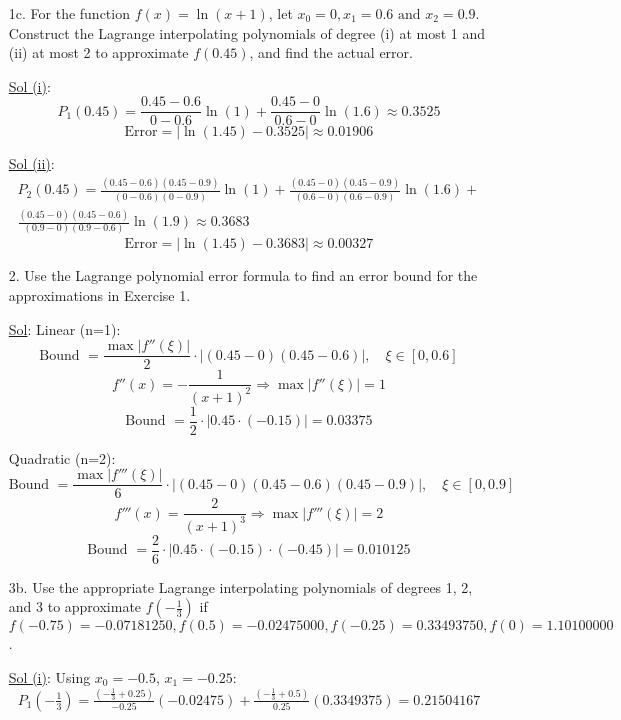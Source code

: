 \begin{enumerate}
  \item[1c.] For the function \( f(x) = \ln (x + 1) \), let \( x_0 =
    0, x_1 = 0.6 \textrm{ and } x_2 = 0.9 \). Construct the Lagrange
    interpolating polynomials of degree (i) at most 1 and (ii) at
    most 2 to approximate \( f(0.45) \), and find the actual error.

    \underline{Sol (i)}:
    \[
      P_1(0.45) = \frac{0.45 - 0.6}{0 - 0.6} \ln(1) + \frac{0.45 -
      0}{0.6 - 0} \ln(1.6) \approx 0.3525
    \]
    \[
      \text{Error} = |\ln(1.45) - 0.3525| \approx \boxed{0.01906}
    \]

    \underline{Sol (ii)}:
    \[
      \begin{array}{l}
        P_2(0.45) = \frac{(0.45-0.6)(0.45-0.9)}{(0-0.6)(0-0.9)}
        \ln(1) + \frac{(0.45-0)(0.45-0.9)}{(0.6-0)(0.6-0.9)} \ln(1.6)
        + \\ \frac{(0.45-0)(0.45-0.6)}{(0.9-0)(0.9-0.6)} \ln(1.9) \approx 0.3683
      \end{array}
    \]
    \[
      \text{Error} = |\ln(1.45) - 0.3683| \approx \boxed{0.00327}
    \]

  \item[2.] Use the Lagrange polynomial error formula to find an
    error bound for the approximations in Exercise 1.

    \underline{Sol}:
    Linear (n=1):
    \[
      \text{Bound } = \frac{\max |f''(\xi)|}{2} \cdot
      |(0.45-0)(0.45-0.6)|, \quad \xi \in [0, 0.6]
    \]
    \[
      f''(x) = -\frac{1}{(x+1)^2} \Rightarrow \max |f''(\xi)| = 1
    \]
    \[
      \text{Bound } = \frac{1}{2} \cdot |0.45 \cdot (-0.15)| = \boxed{0.03375}
    \]

    Quadratic (n=2):
    \[
      \text{Bound } = \frac{\max |f'''(\xi)|}{6} \cdot
      |(0.45-0)(0.45-0.6)(0.45-0.9)|, \quad \xi \in [0, 0.9]
    \]
    \[
      f'''(x) = \frac{2}{(x+1)^3} \Rightarrow \max |f'''(\xi)| = 2
    \]
    \[
      \text{Bound } = \frac{2}{6} \cdot |0.45 \cdot (-0.15) \cdot
      (-0.45)| = \boxed{0.010125}
    \]

  \item[3b.] Use the appropriate Lagrange interpolating polynomials
    of degrees 1, 2, and 3 to approximate \( f(- \frac{1}{3}) \) if
    \( f(-0.75) = -0.07181250, f(0.5) = -0.02475000, f(-0.25) =
    0.33493750, f(0) = 1.10100000 \).

    \underline{Sol (i)}:
    Using \( x_0 = -0.5 \), \( x_1 = -0.25 \):
    \[
      P_1\left(-\tfrac{1}{3}\right) = \tfrac{(-\tfrac{1}{3} +
      0.25)}{-0.25} (-0.02475) + \tfrac{(-\tfrac{1}{3} + 0.5)}{0.25}
      (0.3349375) = \boxed{0.21504167}
    \]


\end{enumerate}
